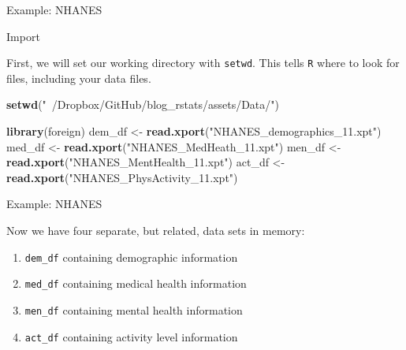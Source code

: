 \documentclass[ignorenonframetext,]{beamer}
\newenvironment{Shaded}{\begin{snugshade}}{\end{snugshade}}
\newcommand{\KeywordTok}[1]{\textcolor[rgb]{0.13,0.29,0.53}{\textbf{{#1}}}}
\newcommand{\StringTok}[1]{\textcolor[rgb]{0.31,0.60,0.02}{{#1}}}
\newcommand{\NormalTok}[1]{{#1}}
\providecommand{\tightlist}{%
\setlength{\itemsep}{0pt}\setlength{\parskip}{0pt}}
\begin{document}
\begin{frame}[fragile]{Example: NHANES}

\begin{block}{Import}

First, we will set our working directory with \texttt{setwd}. This tells
\texttt{R} where to look for files, including your data files.

\begin{Shaded}
\begin{Highlighting}[]
\KeywordTok{setwd}\NormalTok{(}\StringTok{"~/Dropbox/GitHub/blog_rstats/assets/Data/"}\NormalTok{)}
\end{Highlighting}
\end{Shaded}

\begin{Shaded}
\begin{Highlighting}[]
\KeywordTok{library}\NormalTok{(foreign)}
\NormalTok{dem_df <-}\StringTok{ }\KeywordTok{read.xport}\NormalTok{(}\StringTok{"NHANES_demographics_11.xpt"}\NormalTok{)}
\NormalTok{med_df <-}\StringTok{ }\KeywordTok{read.xport}\NormalTok{(}\StringTok{"NHANES_MedHeath_11.xpt"}\NormalTok{)}
\NormalTok{men_df <-}\StringTok{ }\KeywordTok{read.xport}\NormalTok{(}\StringTok{"NHANES_MentHealth_11.xpt"}\NormalTok{)}
\NormalTok{act_df <-}\StringTok{ }\KeywordTok{read.xport}\NormalTok{(}\StringTok{"NHANES_PhysActivity_11.xpt"}\NormalTok{)}
\end{Highlighting}
\end{Shaded}

\end{block}

\end{frame}

\begin{frame}[fragile]{Example: NHANES}

Now we have four separate, but related, data sets in memory:

\begin{enumerate}
\def\labelenumi{\arabic{enumi}.}
\tightlist
\item
  \texttt{dem\_df} containing demographic information
\item
  \texttt{med\_df} containing medical health information
\item
  \texttt{men\_df} containing mental health information
\item
  \texttt{act\_df} containing activity level information
\end{enumerate}

\end{frame}
\end{document}
